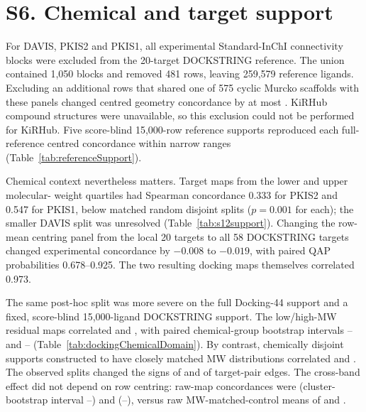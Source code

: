 \documentclass[11pt]{article}
\begin{document}
\section*{S6. Chemical and target support}

For DAVIS, PKIS2 and PKIS1, all experimental Standard-InChI connectivity blocks were
excluded from the 20-target DOCKSTRING reference. The union contained 1,050 blocks and
removed 481 rows, leaving 259,579 reference ligands. Excluding an additional
\FixedTwentyScaffoldRowsExcluded{} rows that shared one of 575 cyclic Murcko scaffolds with
these panels changed centred geometry concordance by at most
\FixedTwentyMaxScaffoldDelta{}. KiRHub compound structures were unavailable, so this
exclusion could not be performed for KiRHub. Five score-blind 15,000-row reference supports
reproduced each full-reference centred concordance within narrow ranges
(Table~\ref{tab:referenceSupport}).

Chemical context nevertheless matters. Target maps from the lower and upper molecular-
weight quartiles had Spearman concordance 0.333 for PKIS2 and 0.547 for PKIS1, below matched
random disjoint splits ($p=0.001$ for each); the smaller DAVIS split was unresolved
(Table~\ref{tab:s12support}). Changing the row-mean centring panel from the local 20 targets
to all 58 DOCKSTRING targets changed experimental concordance by $-0.008$ to $-0.019$, with
paired QAP probabilities 0.678--0.925. The two resulting docking maps themselves correlated
0.973.

The same post-hoc split was more severe on the full Docking-44 support and a fixed,
score-blind 15,000-ligand DOCKSTRING support. The low/high-MW residual maps correlated
\DffMWDomainRho{} and \DsMWDomainRho{}, with paired chemical-group bootstrap intervals
\DffMWDomainLow{}--\DffMWDomainHigh{} and
\DsMWDomainLow{}--\DsMWDomainHigh{} (Table~\ref{tab:dockingChemicalDomain}). By
contrast, chemically disjoint supports constructed to have closely matched MW distributions
correlated \DffMWDomainControl{} and \DsMWDomainControl{}. The observed splits changed
the signs of \DffMWDomainSignFlip{} and \DsMWDomainSignFlip{} of target-pair edges.
The cross-band effect did not depend on row centring: raw-map concordances were
\DffMWRawDomainRho{} (cluster-bootstrap interval
\DffMWRawDomainLow{}--\DffMWRawDomainHigh{}) and \DsMWRawDomainRho{}
(\DsMWRawDomainLow{}--\DsMWRawDomainHigh{}), versus raw MW-matched-control means of
\DffMWRawDomainControl{} and \DsMWRawDomainControl{}.
\end{document}
